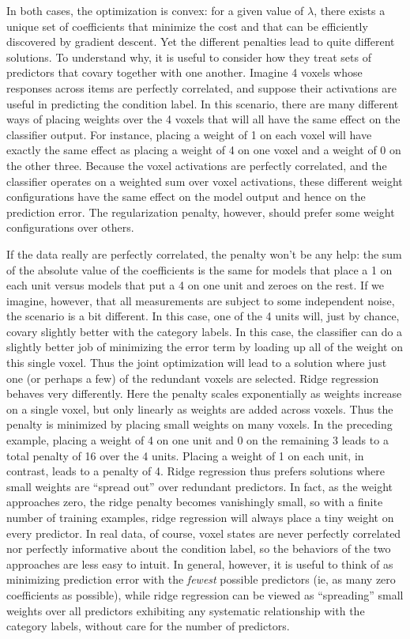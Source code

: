In both cases, the optimization is convex: for a given value of $\lambda$, there exists a unique set of coefficients that minimize the cost and that can be efficiently discovered by gradient descent. Yet the different penalties lead to quite different solutions. To understand why, it is useful to consider how they treat sets of predictors that covary together with one another. Imagine 4 voxels whose responses across items are perfectly correlated, and suppose their activations are useful in predicting the condition label. In this scenario, there are many different ways of placing weights over the 4 voxels that will all have the same effect on the classifier output. For instance, placing a weight of 1 on each voxel will have exactly the same effect as placing a weight of 4 on one voxel and a weight of 0 on the other three. Because the voxel activations are perfectly correlated, and the classifier operates on a weighted sum over voxel activations, these different weight configurations have the same effect on the model output and hence on the prediction error. The regularization penalty, however, should prefer some weight configurations over others.

If the data really are perfectly correlated, the {\lasso} penalty won't be any help: the sum of the absolute value of the coefficients is the same for models that place a 1 on each unit versus models that put a 4 on one unit and zeroes on the rest. If we imagine, however, that all measurements are subject to some independent noise, the scenario is a bit different. In this case, one of the 4 units will, just by chance, covary slightly better with the category labels. In this case, the classifier can do a slightly better job of minimizing the error term by loading up all of the weight on this single voxel. Thus the joint optimization will lead to a solution where just one (or perhaps a few) of the redundant voxels are selected. Ridge regression behaves very differently. Here the penalty scales exponentially as weights increase on a single voxel, but only linearly as weights are added across voxels. Thus the penalty is minimized by placing small weights on many voxels. In the preceding example, placing a weight of 4 on one unit and 0 on the remaining 3 leads to a total penalty of 16 over the 4 units. Placing a weight of 1 on each unit, in contrast, leads to a penalty of 4. Ridge regression thus prefers solutions where small weights are ``spread out'' over redundant predictors. In fact, as the weight approaches zero, the ridge penalty becomes vanishingly small, so with a finite number of training examples, ridge regression will always place a tiny weight on every predictor. In real data, of course, voxel states are never perfectly correlated nor perfectly informative about the condition label, so the behaviors of the two approaches are less easy to intuit. In general, however, it is useful to think of {\lasso} as minimizing prediction error with the {\em fewest} possible predictors (ie, as many zero coefficients as possible), while ridge regression can be viewed as ``spreading'' small weights over all predictors exhibiting any systematic relationship with the category labels, without care for the number of predictors. 

